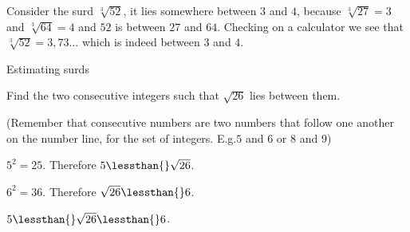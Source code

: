 \label{m38347*notfhsst!!!underscore!!!id71}
\par
%       



\label{m38347*id259412}Consider the surd $\sqrt[3]{52}$, it lies somewhere between $3$ and $4$, because $\sqrt[3]{27}=3$ and $\sqrt[3]{64}=4$ and $52$ is between $27$ and $64$. Checking on a calculator we see that $\sqrt[3]{52}=3,73\ldots$ which is indeed between $3$ and $4$.\par 
\label{m38347*secfhsst!!!underscore!!!id162}\vspace{.5cm} 
\noindent

\begin{wex}{ Estimating surds }{
\label{m38347*id259741}Find the two consecutive integers such that $\sqrt{26}$ lies between them.\par 
\label{m38347*id259757}(Remember that consecutive numbers are two numbers that follow one another on the number line, for the set of integers. E.g.$5$ and $6$ or $8$ and $9$)  }
{
{}     \label{m38347*id259781}${5}^{2}=25$. Therefore $5\lessthan{}\sqrt{26}$.\par 
{} \label{m38347*id259824} ${6}^{2}=36$. Therefore $\sqrt{26}\lessthan{}6$.\par 
{}\label{m38347*id259866} $5\lessthan{}\sqrt{26}\lessthan{}6$. \par 
}
\end{wex}


